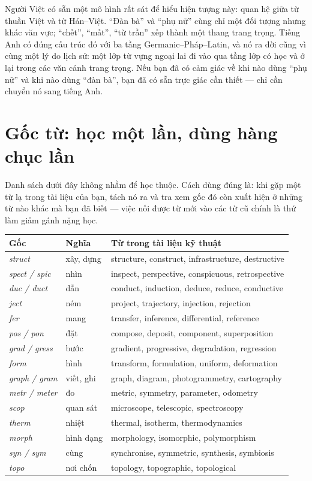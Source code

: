 \documentclass[../../english.tex]{subfiles}
\begin{document}
\begin{trucgiac}
Người Việt có sẵn một mô hình rất sát để hiểu hiện tượng này: quan hệ giữa từ thuần Việt và từ Hán--Việt. ``Đàn bà'' và ``phụ nữ'' cùng chỉ một đối tượng nhưng khác văn vực; ``chết'', ``mất'', ``từ trần'' xếp thành một thang trang trọng. Tiếng Anh có đúng cấu trúc đó với ba tầng Germanic--Pháp--Latin, và nó ra đời cũng vì cùng một lý do lịch sử: một lớp từ vựng ngoại lai đi vào qua tầng lớp có học và ở lại trong các văn cảnh trang trọng. Nếu bạn đã có cảm giác về khi nào dùng ``phụ nữ'' và khi nào dùng ``đàn bà'', bạn đã có sẵn trực giác cần thiết --- chỉ cần chuyển nó sang tiếng Anh.
\end{trucgiac}

\section{Gốc từ: học một lần, dùng hàng chục lần}

Danh sách dưới đây không nhằm để học thuộc. Cách dùng đúng là: khi gặp một từ lạ trong tài liệu của bạn, tách nó ra và tra xem gốc đó còn xuất hiện ở những từ nào khác mà bạn đã biết --- việc nối được từ mới vào các từ cũ chính là thứ làm giảm gánh nặng học.

\begin{center}\footnotesize
\begin{tabularx}{\linewidth}{@{}L{2.2cm}L{2.6cm}Y@{}}
\toprule
\textbf{Gốc} & \textbf{Nghĩa} & \textbf{Từ trong tài liệu kỹ thuật}\\
\midrule
\emph{struct} & xây, dựng & structure, construct, infrastructure, destructive\\
\emph{spect / spic} & nhìn & inspect, perspective, conspicuous, retrospective\\
\emph{duc / duct} & dẫn & conduct, induction, deduce, reduce, conductive\\
\emph{ject} & ném & project, trajectory, injection, rejection\\
\emph{fer} & mang & transfer, inference, differential, reference\\
\emph{pos / pon} & đặt & compose, deposit, component, superposition\\
\emph{grad / gress} & bước & gradient, progressive, degradation, regression\\
\emph{form} & hình & transform, formulation, uniform, deformation\\
\emph{graph / gram} & viết, ghi & graph, diagram, photogrammetry, cartography\\
\emph{metr / meter} & đo & metric, symmetry, parameter, odometry\\
\emph{scop} & quan sát & microscope, telescopic, spectroscopy\\
\emph{therm} & nhiệt & thermal, isotherm, thermodynamics\\
\emph{morph} & hình dạng & morphology, isomorphic, polymorphism\\
\emph{syn / sym} & cùng & synchronise, symmetric, synthesis, symbiosis\\
\emph{topo} & nơi chốn & topology, topographic, topological\\
\bottomrule
\end{tabularx}
\end{center}
\end{document}
